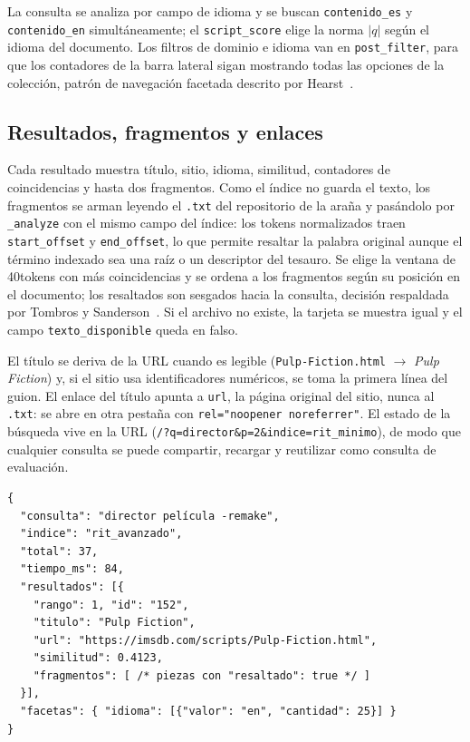 \documentclass[11pt,spanish]{article}
\begin{document}
La consulta se analiza por campo de idioma y se buscan \texttt{contenido\_es} y
\texttt{contenido\_en} simultáneamente; el \texttt{script\_score} elige la norma
$|q|$ según el idioma del documento. Los filtros de dominio e idioma van en
\texttt{post\_filter}, para que los contadores de la barra lateral sigan
mostrando todas las opciones de la colección, patrón de navegación facetada
descrito por Hearst~\cite{hearst2009}.

\subsection{Resultados, fragmentos y enlaces}

Cada resultado muestra título, sitio, idioma, similitud, contadores de
coincidencias y hasta dos fragmentos. Como el índice no guarda el texto, los
fragmentos se arman leyendo el \texttt{.txt} del repositorio de la araña y
pasándolo por \texttt{\_analyze} con el mismo campo del índice: los tokens
normalizados traen \texttt{start\_offset} y \texttt{end\_offset}, lo que permite
resaltar la palabra original aunque el término indexado sea una raíz o un
descriptor del tesauro. Se elige la ventana de 40tokens con más
coincidencias y se ordena a los fragmentos según su posición en el documento;
los resaltados son sesgados hacia la consulta, decisión respaldada por
Tombros y Sanderson~\cite{tombros1998}. Si el archivo no existe, la tarjeta se
muestra igual y el campo \texttt{texto\_disponible} queda en falso.

El título se deriva de la URL cuando es legible (\texttt{Pulp-Fiction.html}
$\to$ \emph{Pulp Fiction}) y, si el sitio usa identificadores numéricos, se
toma la primera línea del guion. El enlace del título apunta a \texttt{url},
la página original del sitio, nunca al \texttt{.txt}: se abre en otra pestaña
con \texttt{rel="noopener noreferrer"}. El estado de la búsqueda vive en la URL
(\texttt{/?q=director\&p=2\&indice=rit\_minimo}), de modo que cualquier consulta
se puede compartir, recargar y reutilizar como consulta de evaluación.

\begin{lstlisting}[caption={Extracto de la respuesta de \texttt{GET /api/buscar} (contrato de datos).}]
{
  "consulta": "director película -remake",
  "indice": "rit_avanzado",
  "total": 37,
  "tiempo_ms": 84,
  "resultados": [{
    "rango": 1, "id": "152",
    "titulo": "Pulp Fiction",
    "url": "https://imsdb.com/scripts/Pulp-Fiction.html",
    "similitud": 0.4123,
    "fragmentos": [ /* piezas con "resaltado": true */ ]
  }],
  "facetas": { "idioma": [{"valor": "en", "cantidad": 25}] }
}
\end{lstlisting}
\end{document}
